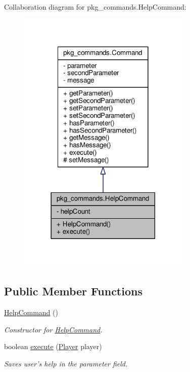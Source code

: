 Collaboration diagram for pkg\-\_\-commands.\-Help\-Command\-:\nopagebreak
\begin{figure}[H]
\begin{center}
\leavevmode
\includegraphics[width=234pt]{classpkg__commands_1_1HelpCommand__coll__graph}
\end{center}
\end{figure}
\subsection*{Public Member Functions}
\begin{DoxyCompactItemize}
\item 
\hyperlink{classpkg__commands_1_1HelpCommand_a5f12eadc1835cd0c7cdb77811b5fb756}{Help\-Command} ()
\begin{DoxyCompactList}\small\item\em Constructor for \hyperlink{classpkg__commands_1_1HelpCommand}{Help\-Command}. \end{DoxyCompactList}\item 
boolean \hyperlink{classpkg__commands_1_1HelpCommand_a332d3e57539dfc82f8c539f8b3e24dd6}{execute} (\hyperlink{classpkg__world_1_1Player}{Player} player)
\begin{DoxyCompactList}\small\item\em Saves user's help in the parameter field. \end{DoxyCompactList}\end{DoxyCompactItemize}
